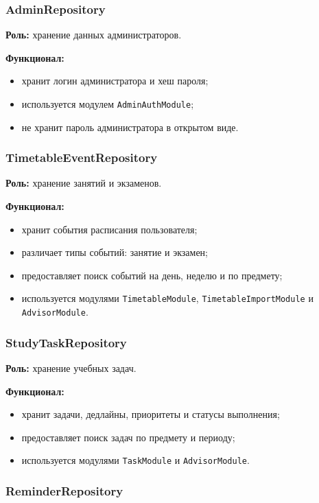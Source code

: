 \documentclass[10pt,a4paper,final]{article} %
\begin{document}
\subsubsection{AdminRepository}

\textbf{Роль:} хранение данных администраторов.

\textbf{Функционал:}
\begin{itemize}
    \item хранит логин администратора и хеш пароля;
    \item используется модулем \texttt{AdminAuthModule};
    \item не хранит пароль администратора в открытом виде.
\end{itemize}

\subsubsection{TimetableEventRepository}

\textbf{Роль:} хранение занятий и экзаменов.

\textbf{Функционал:}
\begin{itemize}
    \item хранит события расписания пользователя;
    \item различает типы событий: занятие и экзамен;
    \item предоставляет поиск событий на день, неделю и по предмету;
    \item используется модулями \texttt{TimetableModule},
    \texttt{TimetableImportModule} и \texttt{AdvisorModule}.
\end{itemize}

\subsubsection{StudyTaskRepository}

\textbf{Роль:} хранение учебных задач.

\textbf{Функционал:}
\begin{itemize}
    \item хранит задачи, дедлайны, приоритеты и статусы выполнения;
    \item предоставляет поиск задач по предмету и периоду;
    \item используется модулями \texttt{TaskModule} и \texttt{AdvisorModule}.
\end{itemize}

\subsubsection{ReminderRepository}
\end{document}
